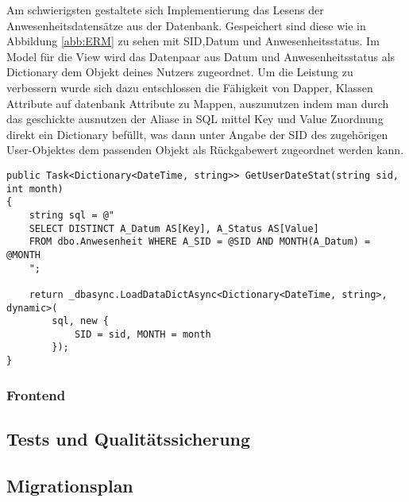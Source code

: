 Am schwierigsten gestaltete sich Implementierung das Lesens der Anwesenheitsdatensätze aus der Datenbank. Gespeichert sind diese wie in Abbildung \ref{abb:ERM} zu sehen mit SID,Datum und Anwesenheitsstatus. Im Model für die View wird das Datenpaar aus Datum und Anwesenheitsstatus als Dictionary dem Objekt deines Nutzers zugeordnet. Um die Leistung zu verbessern wurde sich dazu entschlossen die Fähigkeit von Dapper, Klassen Attribute auf datenbank Attribute zu Mappen, auszunutzen indem man durch das geschickte ausnutzen der Aliase in SQL mittel Key und Value Zuordnung direkt ein Dictionary befüllt, was dann unter Angabe der SID des zugehörigen User-Objektes dem passenden Objekt als Rückgabewert zugeordnet werden kann.
\\
\begin{lstlisting}[frame=single]
public Task<Dictionary<DateTime, string>> GetUserDateStat(string sid, int month)
{
    string sql = @"
    SELECT DISTINCT A_Datum AS[Key], A_Status AS[Value]
    FROM dbo.Anwesenheit WHERE A_SID = @SID AND MONTH(A_Datum) = @MONTH
    ";

    return _dbasync.LoadDataDictAsync<Dictionary<DateTime, string>, dynamic>(
        sql, new {
            SID = sid, MONTH = month
        });
}
\end{lstlisting}

\subsubsection{Frontend}
\label{sec:Frontend}

\subsection{Tests und Qualitätssicherung}
\label{sec:Tests}

\subsection{Migrationsplan}
\label{sec:Migrationsplan}